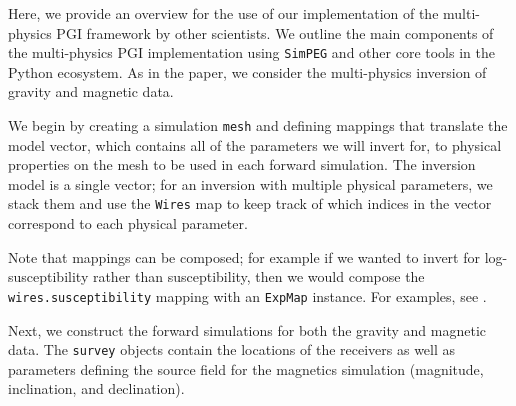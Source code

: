 Here, we provide an overview for the use of our implementation of the multi-physics PGI framework by other scientists. We outline the main components of the multi-physics PGI implementation using \texttt{SimPEG} and other core tools in the Python ecosystem. As in the paper, we consider the multi-physics inversion of gravity and magnetic data.

We begin by creating a simulation \texttt{mesh} and defining mappings that translate the model vector, which contains all of the parameters we will invert for, to physical properties on the mesh to be used in each forward simulation. The inversion model is a single vector; for an inversion with multiple physical parameters, we stack them and use the \texttt{Wires} map to keep track of which indices in the vector correspond to each physical parameter.



Note that mappings can be composed; for example if we wanted to invert for log-susceptibility rather than susceptibility, then we would compose the \texttt{wires.susceptibility} mapping with an \texttt{ExpMap} instance. For examples, see \citet{SeogiMapping}.


Next, we construct the forward simulations for both the gravity and magnetic data. The \texttt{survey} objects contain the locations of the receivers as well as parameters defining the source field for the magnetics simulation (magnitude, inclination, and declination).





